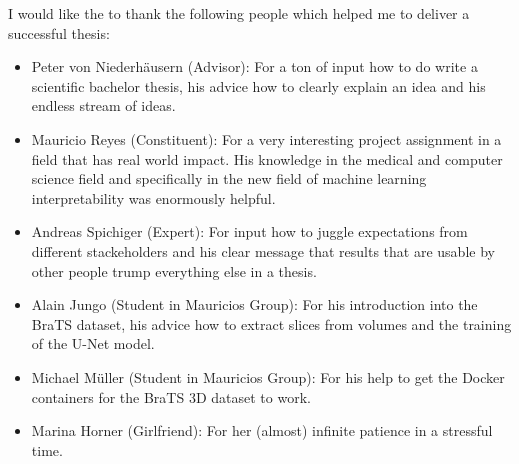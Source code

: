 I would like the to thank the following people which helped me to deliver a successful thesis:
\begin{itemize}
    \item Peter von Niederhäusern (Advisor): For a ton of input how to do write a scientific bachelor thesis, his advice how to clearly explain an idea and his endless stream of ideas.
    \item Mauricio Reyes (Constituent): For a very interesting project assignment in a field that has real world impact. His knowledge in the medical and computer science field and specifically in the new field of machine learning interpretability was enormously helpful.
    \item Andreas Spichiger (Expert): For input how to juggle expectations from different stackeholders and his clear message that results that are usable by other people trump everything else in a thesis.
    \item Alain Jungo (Student in Mauricios Group): For his introduction into the BraTS dataset, his advice how to extract slices from volumes and the training of the U-Net model.
    \item Michael Müller (Student in Mauricios Group): For his help to get the Docker containers for the BraTS 3D dataset to work.
    \item Marina Horner (Girlfriend): For her (almost) infinite patience in a stressful time.
\end{itemize}

